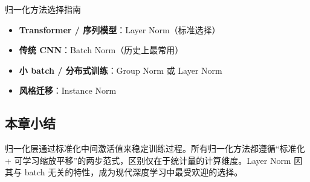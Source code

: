 \begin{importantbox}{归一化方法选择指南}
\begin{itemize}
    \item \textbf{Transformer / 序列模型}：Layer Norm（标准选择）
    \item \textbf{传统 CNN}：Batch Norm（历史上最常用）
    \item \textbf{小 batch / 分布式训练}：Group Norm 或 Layer Norm
    \item \textbf{风格迁移}：Instance Norm
\end{itemize}
\end{importantbox}

\subsection{本章小结}

归一化层通过标准化中间激活值来稳定训练过程。所有归一化方法都遵循``标准化 + 可学习缩放平移''的两步范式，区别仅在于统计量的计算维度。Layer Norm 因其与 batch 无关的特性，成为现代深度学习中最受欢迎的选择。


